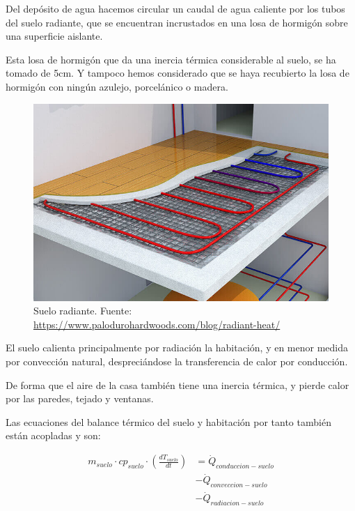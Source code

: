 Del depósito de agua hacemos circular un caudal de agua caliente por los
tubos del suelo radiante, que se encuentran incrustados en una losa de hormigón
sobre una superficie aislante.

Esta losa de hormigón que da una inercia térmica considerable al suelo, se ha
tomado de 5cm. Y tampoco hemos considerado que se haya recubierto la losa de
hormigón con ningún azulejo, porcelánico o madera.

\begin{figure}[h] \centering
	\centering
	\includegraphics[width=1\textwidth]{./capitulos/resultados_discusion/images/radiant_heating_floor.jpg}
	\caption{Suelo radiante. Fuente: \url{https://www.palodurohardwoods.com/blog/radiant-heat/}}
	\label{fig:radiant_heating_floor}
\end{figure}

El suelo calienta principalmente por radiación la habitación, y en menor
medida por convección natural, despreciándose la transferencia de calor por
conducción.

De forma que el aire de la casa también tiene una inercia térmica, y pierde
calor por las paredes, tejado y ventanas.

Las ecuaciones del balance térmico del suelo y habitación por tanto también
están acopladas y son:

\begin{align} \label{eq:floor_energy_conservation}
	m_{suelo} \cdot cp_{suelo} \cdot \left( \frac{dT_{suelo}}{dt} \right) & = \dot{Q}_{conduccion-suelo} \nonumber \\
	                                                                      & - \dot{Q}_{conveccion-suelo} \nonumber \\
	                                                                      & - \dot{Q}_{radiacion-suelo}  \nonumber \\
\end{align}

